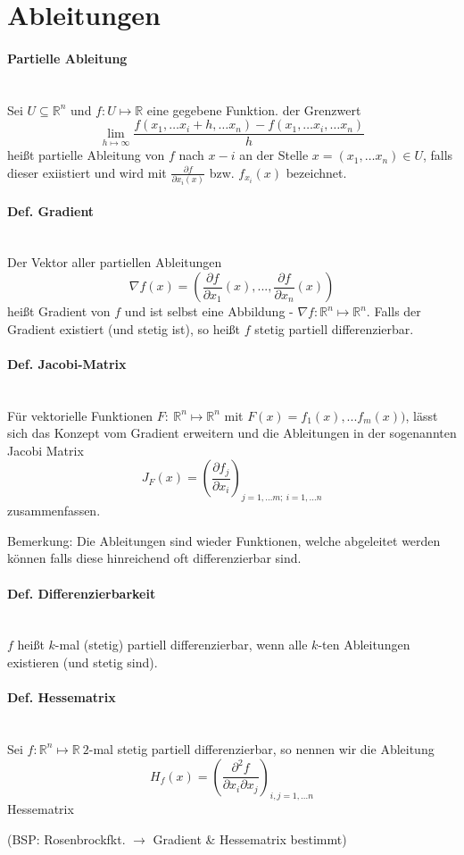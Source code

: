 \section{Ableitungen}
\label{chap:Ableitungen}

\paragraph{Partielle Ableitung}\ \\
Sei $U \subseteq \mathbb{R}^n$ und $f: U \mapsto \mathbb{R}$ eine gegebene Funktion. der Grenzwert
$$\lim_{h \mapsto \infty}\frac{f(x_1, \dots x_i+h,\dots x_n)-f(x_1,\dots x_i,\dots x_n)}{h}$$
heißt partielle Ableitung von $f$ nach $x-i$ an der Stelle $x=(x_1,\dots x_n)\in U$, falls dieser exiistiert und wird mit $\frac{\partial f}{\partial x_i(x)}$ bzw. $f_{x_i}(x)$ bezeichnet.\\


\paragraph{Def. Gradient}\ \\
Der Vektor aller partiellen Ableitungen 
$$\nabla f(x) = \left(\frac{\partial f}{\partial x_1}(x), ... , \frac{\partial f}{\partial x_n} (x) \right)$$ heißt Gradient von $f$ und ist selbst eine Abbildung - $\nabla f : \mathbb R^n \mapsto \mathbb R^n$. Falls der Gradient existiert (und stetig ist), so heißt $f$ stetig partiell differenzierbar.

\paragraph{Def. Jacobi-Matrix}\ \\
Für vektorielle Funktionen $F: \ \mathbb{R}^n \mapsto \mathbb{R}^n$ mit $F(x) = f_1(x), ... f_m(x))$, lässt sich das Konzept vom Gradient erweitern und die Ableitungen in der sogenannten Jacobi Matrix
$$J_F (x) = (\frac{\partial f_j}{\partial x_i})_{j= 1,\dots m;\ i= 1,\dots n}$$
zusammenfassen.

Bemerkung: Die Ableitungen sind wieder Funktionen, welche abgeleitet werden können falls diese hinreichend oft differenzierbar sind.

\paragraph{Def. Differenzierbarkeit}\ \\
$f$ heißt $k$-mal (stetig) partiell differenzierbar, wenn alle $k$-ten Ableitungen existieren (und stetig sind).

\paragraph{Def. Hessematrix}\ \\
Sei $f: \mathbb R^n \mapsto \mathbb R\ 2$-mal stetig partiell differenzierbar, so nennen wir die Ableitung
$$H_f(x) = \left(\frac{\partial^2f}{\partial x_i \partial x_j} \right)_{i,j=1,...n}$$ Hessematrix

(BSP: Rosenbrockfkt. $\rightarrow$ Gradient \& Hessematrix bestimmt)
